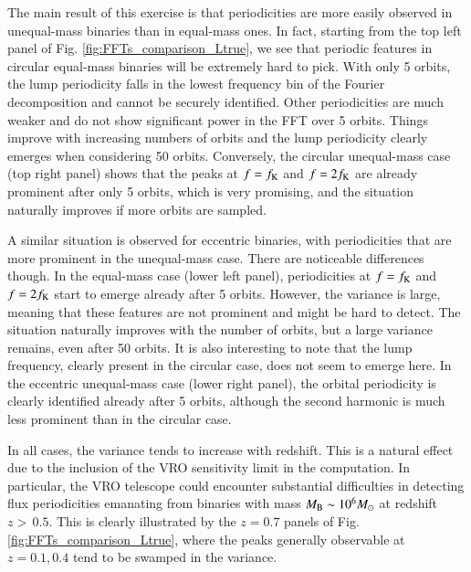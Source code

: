 \documentclass{aa}
\begin{document}
The main result of this exercise is that periodicities are more easily observed in unequal-mass binaries than in equal-mass ones. In fact, starting from the top left panel of Fig. \ref{fig:FFTs_comparison_Ltrue}, we see that periodic features in circular equal-mass binaries will be extremely hard to pick. With only 5 orbits, the lump periodicity falls in the lowest frequency bin of the Fourier decomposition and cannot be securely identified. Other periodicities are much weaker and do not show significant power in the FFT over 5 orbits. Things improve with increasing numbers of orbits and the lump periodicity clearly emerges when considering 50 orbits.
Conversely, the circular unequal-mass case (top right panel) shows that the peaks at $f=f_{\rm K}$ and $f=2f_{\rm K}$ are already prominent after only 5 orbits, which is very promising, and the situation naturally improves if more orbits are sampled.

A similar situation is observed for eccentric binaries, with periodicities that are more prominent in the unequal-mass case. There are noticeable differences though. In the equal-mass case (lower left panel), periodicities at $f=f_{\rm K}$ and $f=2f_{\rm K}$ start to emerge already after 5 orbits. However, the variance is large, meaning that these features are not prominent and might be hard to detect. The situation naturally improves with the number of orbits, but a large variance remains, even after 50 orbits. It is also interesting to note that the lump frequency, clearly present in the circular case, does not seem to emerge here. In the eccentric unequal-mass case (lower right panel), the orbital periodicity is clearly identified already after 5 orbits, although the second harmonic is much less prominent than in the circular case.

In all cases, the variance tends to increase with redshift. This is a natural effect due to the inclusion of the VRO sensitivity limit in the computation. In particular, the VRO telescope could encounter substantial difficulties in detecting flux periodicities emanating from binaries with mass $M_{\rm B} \sim 10^6 M_{\odot}$ at redshift $z > \, 0.5$. This is clearly illustrated by the $z=0.7$ panels of Fig. \ref{fig:FFTs_comparison_Ltrue}, where the peaks generally observable at $z=0.1, 0.4$ tend to be swamped in the variance.
\end{document}
